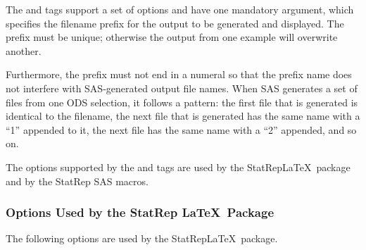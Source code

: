\documentclass[article,oneside]{memoir}
\newcommand*{\StatRep}{\textsf{StatRep}\xspace}
\begin{document}
     The  and  tags support a set of options and have one
     mandatory argument, which specifies the filename prefix for the output
     to be generated and displayed.
     The prefix must be unique; otherwise the output from one example will
     overwrite another.

     Furthermore, the prefix must not end in a numeral so that the prefix name does not interfere
     with SAS-generated output file names.
    When SAS generates a set of files from one ODS selection, it follows a
    pattern: the first file that is generated is identical to the filename, the next
    file that is generated has the same name with a ``1'' appended to it, the next file
    has the same name with a ``2'' appended, and so on.

     The options supported by the  and  tags are used by
     the \StatRep \LaTeX\ package and by the \StatRep SAS macros.

     \subsubsection{Options Used by the \textsf{StatRep} \LaTeX\ Package}
  The following options are used by the \StatRep \LaTeX\ package.
\end{document}
